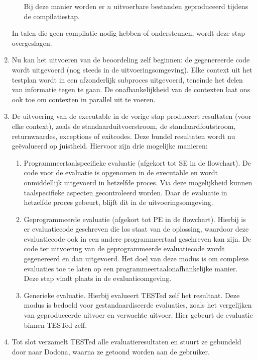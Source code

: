 \begin{enumerate}
\begin{enumerate}
        Bij deze manier worden er $n$ uitvoerbare bestanden geproduceerd tijdens de compilatiestap.
    \end{enumerate}
    In talen die geen compilatie nodig hebben of ondersteunen, wordt deze stap overgeslagen.
    \item Nu kan het uitvoeren van de beoordeling zelf beginnen: de gegenereerde code wordt uitgevoerd (nog steeds in de uitvoeringsomgeving).
    Elke context uit het testplan wordt in een afzonderlijk subproces uitgevoerd, teneinde het delen van informatie tegen te gaan.
    De onafhankelijkheid van de contexten laat ons ook toe om contexten in parallel uit te voeren.
    \item De uitvoering van de executable in de vorige stap produceert resultaten (voor elke context), zoals de standaarduitvoerstroom, de standaardfoutstroom, returnwaardes, exceptions of exitcodes.
    Deze bundel resultaten wordt nu geëvalueerd op juistheid.
    Hiervoor zijn drie mogelijke manieren:
    \begin{enumerate}
        \item Programmeertaalspecifieke evaluatie (afgekort tot SE in de flowchart).
        De code voor de evaluatie is opgenomen in de executable en wordt onmiddellijk uitgevoerd in hetzelfde proces.
        Via deze mogelijkheid kunnen taalspecifieke aspecten gecontroleerd worden.
        Daar de evaluatie in hetzelfde proces gebeurt, blijft dit in de uitvoeringsomgeving.
        \item Geprogrammeerde evaluatie (afgekort tot PE in de flowchart).
        Hierbij is er evaluatiecode geschreven die los staat van de oplossing, waardoor deze evaluatiecode ook in een andere programmeertaal geschreven kan zijn.
        De code ter uitvoering van de geprogrammeerde evaluatiecode wordt gegenereerd en dan uitgevoerd.
        Het doel van deze modus is om complexe evaluaties toe te laten op een programmeertaalonafhankelijke manier.
        Deze stap vindt plaats in de evaluatieomgeving.
        \item Generieke evaluatie.
        Hierbij evalueert TESTed zelf het resultaat.
        Deze modus is bedoeld voor gestandaardiseerde evaluaties, zoals het vergelijken van geproduceerde uitvoer en verwachte uitvoer.
        Hier gebeurt de evaluatie binnen TESTed zelf.
    \end{enumerate}
    \item Tot slot verzamelt TESTed alle evaluatieresultaten en stuurt ze gebundeld door naar Dodona, waarna ze getoond worden aan de gebruiker.
\end{enumerate}

